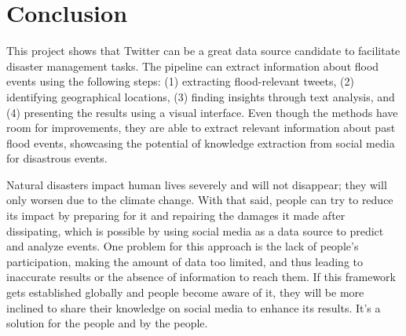 \chapter{Conclusion}%
This project shows that Twitter can be a great data source candidate to facilitate disaster
management tasks. The pipeline can extract information about flood events using the following steps:
(1) extracting flood-relevant tweets, (2) identifying geographical locations, (3) finding insights
through text analysis, and (4) presenting the results using a visual interface. Even though the
methods have room for improvements, they are able to extract relevant information about past flood
events, showcasing the potential of knowledge extraction from social media for disastrous events.

Natural disasters impact human lives severely and will not disappear; they will only worsen due to
the climate change. With that said, people can try to reduce its impact by preparing for it and
repairing the damages it made after dissipating, which is possible by using social media as a data
source to predict and analyze events. One problem for this approach is the lack of people's
participation, making the amount of data too limited, and thus leading to inaccurate results or the
absence of information to reach them. If this framework gets established globally and people become
aware of it, they will be more inclined to share their knowledge on social media to enhance its
results. It's a solution for the people and by the people.

